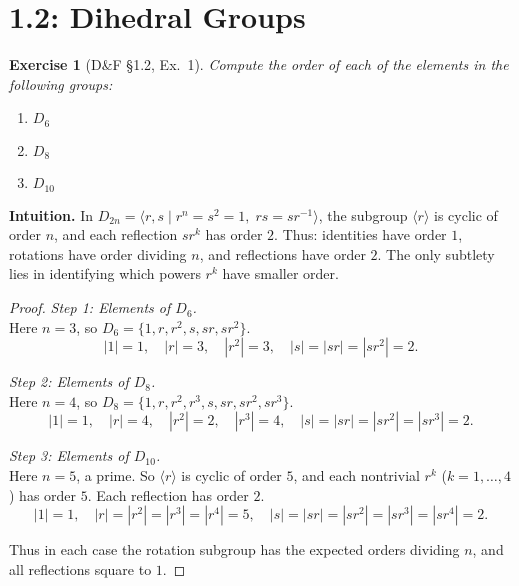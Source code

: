 \documentclass[12pt]{article}
\newtheorem{exercise}[theorem]{Exercise}
\theoremstyle{definition}
\begin{document}
\newpage

\dotfill
\section*{1.2: Dihedral Groups}
\dotfill

\newpage

\begin{exercise}[D\&F §1.2, Ex.~1]
Compute the order of each of the elements in the following groups:
\begin{enumerate}
\item[(a)] $D_{6}$
\item[(b)] $D_{8}$
\item[(c)] $D_{10}$
\end{enumerate}
\end{exercise}

\dotfill

\noindent
\textbf{Intuition.}
In $D_{2n}=\langle r,s\mid r^{n}=s^{2}=1,\;rs=sr^{-1}\rangle$, the subgroup 
$\langle r\rangle$ is cyclic of order $n$, and each reflection $sr^{k}$ has order $2$.
Thus: identities have order $1$, rotations have order dividing $n$, and reflections have order $2$.
The only subtlety lies in identifying which powers $r^{k}$ have smaller order.

\dotfill

\begin{proof}
\noindent\emph{Step 1: Elements of $D_{6}$.}\\

\noindent
Here $n=3$, so $D_{6}=\{1,r,r^{2},s,sr,sr^{2}\}$. 
\[
|1|=1,\quad |r|=3,\quad |r^{2}|=3,\quad |s|=|sr|=|sr^{2}|=2.
\]

\dotfill

\noindent\emph{Step 2: Elements of $D_{8}$.}\\

\noindent
Here $n=4$, so $D_{8}=\{1,r,r^{2},r^{3},s,sr,sr^{2},sr^{3}\}$. 
\[
|1|=1,\quad |r|=4,\quad |r^{2}|=2,\quad |r^{3}|=4,\quad |s|=|sr|=|sr^{2}|=|sr^{3}|=2.
\]

\dotfill

\noindent\emph{Step 3: Elements of $D_{10}$.}\\

\noindent
Here $n=5$, a prime. So $\langle r\rangle$ is cyclic of order $5$, and each nontrivial $r^{k}$ ($k=1,\dots,4$) has order $5$. 
Each reflection has order $2$.
\[
|1|=1,\quad |r|=|r^{2}|=|r^{3}|=|r^{4}|=5,\quad |s|=|sr|=|sr^{2}|=|sr^{3}|=|sr^{4}|=2.
\]

\dotfill

Thus in each case the rotation subgroup has the expected orders dividing $n$, and all reflections square to $1$. 
\end{proof}
\end{document}
